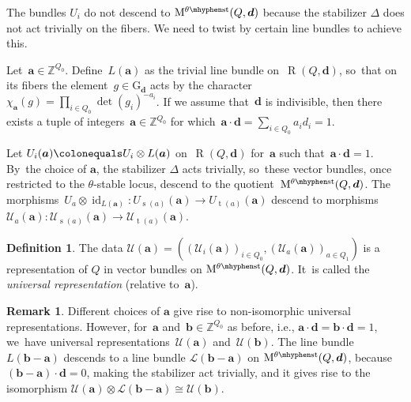 \documentclass[11pt]{article}
\theoremstyle{plain}
\theoremstyle{definition}
\newtheorem{definition}[theorem]{Definition}
\newtheorem{remark}[theorem]{Remark}
\DeclareMathOperator\Rep{R}
\DeclareMathOperator\source{s}
\DeclareMathOperator\target{t}
\newcommand\group[1][\tuple{d}]{\mathrm{G}_{#1}}
\newcommand\stable{\ensuremath{\mhyphen\mathrm{st}}}
\newcommand\tuple[1]{\ensuremath{{\boldsymbol{#1}}}}
\begin{document}
The bundles $U_i$ do not descend to $\modulispace[\theta\stable]{Q,\tuple{d}}$
because the stabilizer $\Delta$ does not act trivially on the fibers.
We need to twist by certain line bundles to achieve this.

Let~$\tuple{a} \in \mathbb{Z}^{Q_0}$.
Define~$L(\tuple{a})$ as the trivial line bundle on~$\Rep(Q,\tuple{d})$, so~that on its fibers the element~$g \in \group$ acts by
the character~$\chi_\tuple{a}(g) = \prod_{i \in Q_0} \det(g_i)^{-a_i}$.
If we assume that~$\tuple{d}$ is indivisible,
then there exists a tuple of integers~$\tuple{a} \in \mathbb{Z}^{Q_0}$
for which~$\tuple{a}\cdot\tuple{d}=\sum_{i \in Q_0}a_i d_i = 1$.

Let $U_i(\tuple{a}) \colonequals U_i \otimes L(\tuple{a})$ on~$\Rep(Q,\tuple{d})$
for~$\tuple{a}$ such that~$\tuple{a}\cdot\tuple{d}=1$. By~the choice of $\tuple{a}$, the stabilizer $\Delta$ acts trivially, so~these vector bundles, once restricted to the $\theta$-stable locus,
descend to the quotient~$\modulispace[\theta\stable]{Q,\tuple{d}}$.
The morphisms~$U_a \otimes \operatorname{id}_{L(\tuple{a})}\colon U_{\source(a)}(\tuple{a}) \to U_{\target(a)}(\tuple{a})$
descend to morphisms~$\mathcal{U}_a(\tuple{a})\colon \mathcal{U}_{\source(a)}(\tuple{a}) \to \mathcal{U}_{\target(a)}(\tuple{a})$.

\begin{definition}
The data $\mathcal{U}(\tuple{a}) = ((\mathcal{U}_i(\tuple{a}))_{i \in Q_0},(\mathcal{U}_a(\tuple{a}))_{a \in Q_1})$
is a representation of $Q$ in vector bundles on $\modulispace[\theta\stable]{Q,\tuple{d}}$. It~is called the \emph{universal representation} (relative to~$\tuple{a}$).
\end{definition}

\begin{remark}
\label{remark:uniqueness-up-to-twist-universal-bundle}
Different choices of $\tuple{a}$ give rise to non-isomorphic universal representations.
However, for~$\tuple{a}$ and~$\tuple{b} \in \mathbb{Z}^{Q_0}$ as before,
i.e., $\tuple{a}\cdot\tuple{d}=\tuple{b}\cdot\tuple{d}=1$, we~have universal representations~$\mathcal{U}(\tuple{a})$ and~$\mathcal{U}(\tuple{b})$.
The line bundle $L(\tuple{b} - \tuple{a})$
descends to a line bundle $\mathcal{L}(\tuple{b} - \tuple{a})$ on $\modulispace[\theta\stable]{Q,\tuple{d}}$,
because~$(\tuple{b}-\tuple{a})\cdot\tuple{d}=0$,
making the stabilizer act trivially,
and it gives rise to the isomorphism $\mathcal{U}(\tuple{a}) \otimes \mathcal{L}(\tuple{b} - \tuple{a}) \cong \mathcal{U}(\tuple{b})$.
\end{remark}
\end{document}
